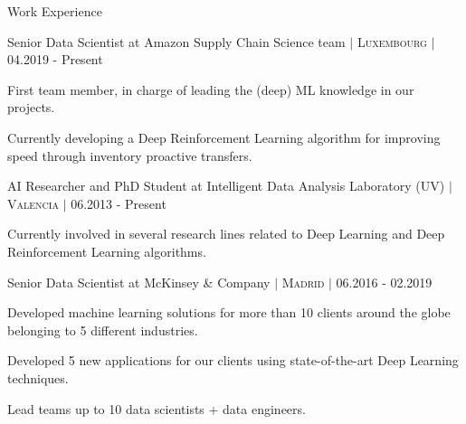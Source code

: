 \documentclass{resume} %
\begin{document}
\begin{rSection}{ Work Experience } \itemsep -1pt       
\begin{rSubsection}{Senior Data Scientist at Amazon Supply Chain Science team  $|$  \textnormal{\textsc{Luxembourg}} $|$ \textnormal{04.2019 - Present}}{}{}    
	
	\vspace{-3pt}
	
	\item First team member, in charge of leading the (deep) ML knowledge in our projects.
	\item Currently developing a Deep Reinforcement Learning algorithm for improving speed through inventory proactive transfers.
\end{rSubsection} 


\vspace{-6pt}

\begin{rSubsection}{AI Researcher and PhD Student at Intelligent Data Analysis Laboratory (UV)  $|$  \textnormal{\textsc{Valencia}} $|$ \textnormal{06.2013 - Present}}{}{}
	
	\vspace{-3pt}
	
	\item Currently involved in several research lines related to Deep Learning and Deep Reinforcement Learning algorithms.
	
\end{rSubsection}
	
\vspace{-6pt}

\begin{rSubsection}{Senior Data Scientist at McKinsey \& Company  $|$ \textnormal{\textsc{Madrid}} $|$ \textnormal{06.2016 - 02.2019}}{}{}    
    
    \vspace{-3pt}
    
    \item Developed machine learning solutions for more than 10 clients around the globe belonging to 5 different industries.
    \item Developed 5 new applications for our clients using state-of-the-art Deep Learning techniques.
    \item Lead teams up to 10 data scientists + data engineers.
\end{rSubsection} 

\vspace{-6pt}


\end{rSection}
\end{document}
